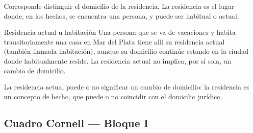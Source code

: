 \documentclass[12pt,oneside]{book}
\begin{document}
Corresponde distinguir el domicilio de la residencia. La residencia es el lugar donde, en los hechos, se encuentra una persona, y puede ser habitual o actual.

\begin{example}{Residencia actual u habitación}
Una persona que se va de vacaciones y habita transitoriamente una casa en Mar del Plata tiene allí su residencia actual (también llamada habitación), aunque su domicilio continúe estando en la ciudad donde habitualmente reside. La residencia actual no implica, por sí sola, un cambio de domicilio.
\end{example}

La residencia actual puede o no significar un cambio de domicilio: la residencia es un concepto de hecho, que puede o no coincidir con el domicilio jurídico.

\subsection*{Cuadro Cornell --- Bloque I}
\end{document}
